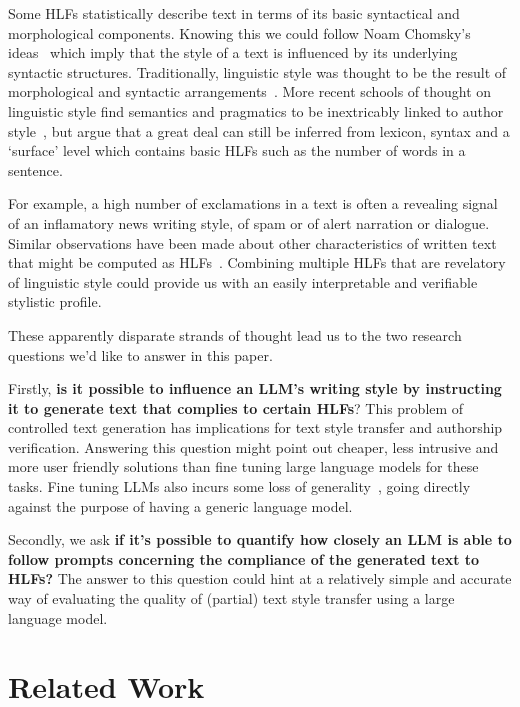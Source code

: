 \documentclass[11pt]{article}
\begin{document}
Some HLFs statistically describe text in terms of its basic syntactical and
morphological components.
Knowing this we could follow Noam Chomsky's ideas~\cite{chomsky2002syntactic}
which imply that the style of a text is influenced by its underlying syntactic
structures.
Traditionally, linguistic style was thought to be the result of morphological
and syntactic arrangements~\cite{lugea2023stylistics}.
More recent schools of thought on linguistic style find semantics and pragmatics
to be inextricably linked to author style~\cite{verma2019lexical}, but argue
that a great deal can still be inferred from lexicon, syntax and a `surface'
level which contains basic HLFs such as the number of words in a sentence.

For example, a high number of exclamations in a text is often a revealing
signal of an inflamatory news writing style, of spam or of alert narration or
dialogue.
Similar observations have been made about other characteristics of written text
that might be computed as HLFs~\cite{hovy1987generating,lugea2023stylistics}.
Combining multiple HLFs that are revelatory of linguistic style could provide us
with an easily interpretable and verifiable stylistic profile.

These apparently disparate strands of thought lead us to the two research
questions we'd like to answer in this paper.

Firstly, \textbf{is it possible to influence an LLM's writing style by
    instructing it to generate text that complies to certain HLFs}?
This problem of controlled text generation has implications for text style
transfer and authorship verification.
Answering this question might point out cheaper, less intrusive and more user
friendly solutions than fine tuning large language models for these tasks.
Fine tuning LLMs also incurs some loss of generality~\cite{yang2024unveiling},
going directly against the purpose of having a generic language model.

Secondly, we ask \textbf{if it's possible to quantify how closely an LLM is able
    to follow prompts concerning the compliance of the generated text to HLFs?}
The answer to this question could hint at a relatively simple and accurate way
of evaluating the quality of (partial) text style transfer using a large
language model.

\section{Related Work}\label{related}
\end{document}
